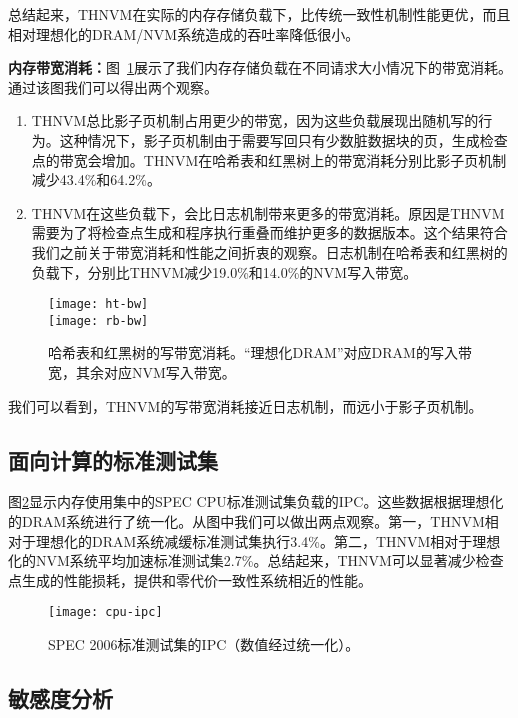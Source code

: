 总结起来，THNVM在实际的内存存储负载下，比传统一致性机制性能更优，而且相对理想化的DRAM/NVM系统造成的吞吐率降低很小。 

\textbf{内存带宽消耗：}图~\ref{fig:rb-bw}展示了我们内存存储负载在不同请求大小情况下的带宽消耗。通过该图我们可以得出两个观察。
\begin{enumerate}
\item THNVM总比影子页机制占用更少的带宽，因为这些负载展现出随机写的行为。这种情况下，影子页机制由于需要写回只有少数脏数据块的页，生成检查点的带宽会增加。THNVM在哈希表和红黑树上的带宽消耗分别比影子页机制减少43.4\%和64.2\%。
\item THNVM在这些负载下，会比日志机制带来更多的带宽消耗。原因是THNVM需要为了将检查点生成和程序执行重叠而维护更多的数据版本。这个结果符合我们之前关于带宽消耗和性能之间折衷的观察。日志机制在哈希表和红黑树的负载下，分别比THNVM减少19.0\%和14.0\%的NVM写入带宽。
\end{enumerate}

\begin{figure}[!ht]
\centering
\texttt{[image: ht-bw]}\\
\texttt{[image: rb-bw]}\\
\caption{哈希表和红黑树的写带宽消耗。``理想化DRAM''对应DRAM的写入带宽，其余对应NVM写入带宽。}
\label{fig:rb-bw}
\end{figure}

我们可以看到，THNVM的写带宽消耗接近日志机制，而远小于影子页机制。

\subsection{面向计算的标准测试集}

图\ref{fig:cpu-ipc}显示内存使用集中的SPEC CPU标准测试集负载的IPC。这些数据根据理想化的DRAM系统进行了统一化。从图中我们可以做出两点观察。第一，THNVM相对于理想化的DRAM系统减缓标准测试集执行3.4\%。第二，THNVM相对于理想化的NVM系统平均加速标准测试集2.7\%。总结起来，THNVM可以显著减少检查点生成的性能损耗，提供和零代价一致性系统相近的性能。
 
\begin{figure}[!ht]
  \centering
  \texttt{[image: cpu-ipc]}
  \caption{SPEC 2006标准测试集的IPC（数值经过统一化）。}
  \label{fig:cpu-ipc}
\end{figure}
 
\subsection{敏感度分析}

